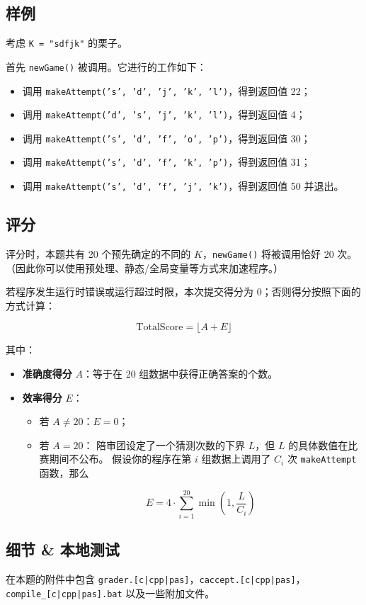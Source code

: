 \documentclass[UTF8, 11pt, a4paper]{article}
\begin{document}
\subsection*{样例}
考虑 \texttt{K = "sdfjk"} 的栗子。

首先 \texttt{newGame()} 被调用。它进行的工作如下：
\begin{itemize}
    \item 调用 \texttt{makeAttempt('s', 'd', 'j', 'k', 'l')}，得到返回值 22；
    \item 调用 \texttt{makeAttempt('d', 's', 'j', 'k', 'l')}，得到返回值 4；
    \item 调用 \texttt{makeAttempt('s', 'd', 'f', 'o', 'p')}，得到返回值 30；
    \item 调用 \texttt{makeAttempt('s', 'd', 'f', 'k', 'p')}，得到返回值 31；
    \item 调用 \texttt{makeAttempt('s', 'd', 'f', 'j', 'k')}，得到返回值 50 并退出。
\end{itemize}

\subsection*{评分}
评分时，本题共有 20 个预先确定的不同的 $K$，\texttt{newGame()} 将被调用恰好 20 次。%
（因此你可以使用预处理、静态/全局变量等方式来加速程序。）

若程序发生运行时错误或运行超过时限，本次提交得分为 0；否则得分按照下面的方式计算：

$$
    \mathrm{TotalScore} = \lfloor A + E \rfloor
$$

其中：
\begin{itemize}
    \item \textbf{准确度得分} $A$：等于在 20 组数据中获得正确答案的个数。
    \item \textbf{效率得分} $E$：
    \begin{itemize}
        \item 若 $A \neq 20$：$E = 0$；
        \item 若 $A = 20$：
            陪审团设定了一个猜测次数的下界 $L$，但 $L$ 的具体数值在比赛期间不公布。
            假设你的程序在第 $i$ 组数据上调用了 $C_i$ 次 \texttt{makeAttempt} 函数，那么

            $$
                E = 4 \cdot \sum_{i = 1}^{20} \min\left(1, \frac{L}{C_i}\right)
            $$
    \end{itemize}
\end{itemize}

\subsection*{细节 \& 本地测试}
在本题的附件中包含 \texttt{grader.[c|cpp|pas]}，\texttt{caccept.[c|cpp|pas]}，%
\texttt{compile\_[c|cpp|pas].bat} 以及一些附加文件。
\end{document}
